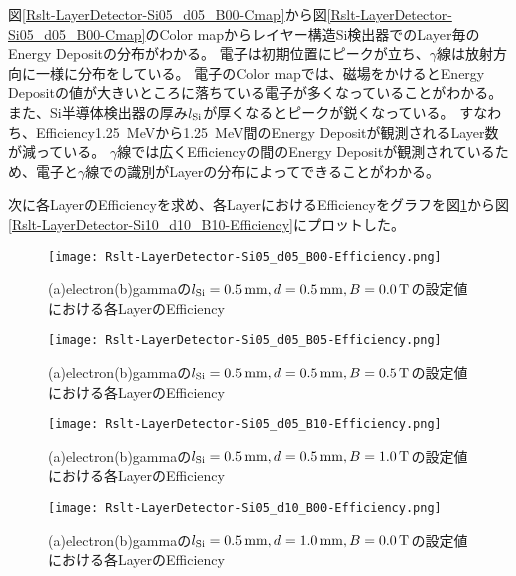 \documentclass[a4paper,10pt]{jreport}
\begin{document}
図\ref{Rslt-LayerDetector-Si05_d05_B00-Cmap}から図\ref{Rslt-LayerDetector-Si05_d05_B00-Cmap}のColor mapからレイヤー構造Si検出器でのLayer毎のEnergy Depositの分布がわかる。
電子は初期位置にピークが立ち、$\gamma$線は放射方向に一様に分布をしている。
電子のColor mapでは、磁場をかけるとEnergy Depositの値が大きいところに落ちている電子が多くなっていることがわかる。
また、Si半導体検出器の厚み$l_{\rm{Si}}$が厚くなるとピークが鋭くなっている。
すなわち、Efficiency\SI{1.25}{MeV}から\SI{1.25}{MeV}間のEnergy Depositが観測されるLayer数が減っている。
$\gamma$線では広くEfficiencyの間のEnergy Depositが観測されているため、電子と$\gamma$線での識別がLayerの分布によってできることがわかる。

次に各LayerのEfficiencyを求め、各LayerにおけるEfficiencyをグラフを図\ref{Rslt-LayerDetector-Si05_d05_B00-Efficiency}から図\ref{Rslt-LayerDetector-Si10_d10_B10-Efficiency}にプロットした。

\begin{figure}[H]
	\center
	\texttt{[image: Rslt-LayerDetector-Si05\_d05\_B00-Efficiency.png]}
	\caption{(a)electron(b)gammaの$l_{\rm{Si}}=\SI{0.5}{mm}, d=\SI{0.5}{mm}, B=\SI{0.0}{T}$の設定値における各LayerのEfficiency}
	\label{Rslt-LayerDetector-Si05_d05_B00-Efficiency}
\end{figure}

\begin{figure}[H]
	\center
	\texttt{[image: Rslt-LayerDetector-Si05\_d05\_B05-Efficiency.png]}
	\caption{(a)electron(b)gammaの$l_{\rm{Si}}=\SI{0.5}{mm}, d=\SI{0.5}{mm}, B=\SI{0.5}{T}$の設定値における各LayerのEfficiency}
	\label{Rslt-LayerDetector-Si05_d05_B05-Efficiency}
\end{figure}

\begin{figure}[H]
	\center
	\texttt{[image: Rslt-LayerDetector-Si05\_d05\_B10-Efficiency.png]}
	\caption{(a)electron(b)gammaの$l_{\rm{Si}}=\SI{0.5}{mm}, d=\SI{0.5}{mm}, B=\SI{1.0}{T}$の設定値における各LayerのEfficiency}
	\label{Rslt-LayerDetector-Si05_d05_B10-Efficiency}
\end{figure}

\begin{figure}[H]
	\center
	\texttt{[image: Rslt-LayerDetector-Si05\_d10\_B00-Efficiency.png]}
	\caption{(a)electron(b)gammaの$l_{\rm{Si}}=\SI{0.5}{mm}, d=\SI{1.0}{mm}, B=\SI{0.0}{T}$の設定値における各LayerのEfficiency}
	\label{Rslt-LayerDetector-Si05_d10_B00-Efficiency}
\end{figure}
\end{document}
